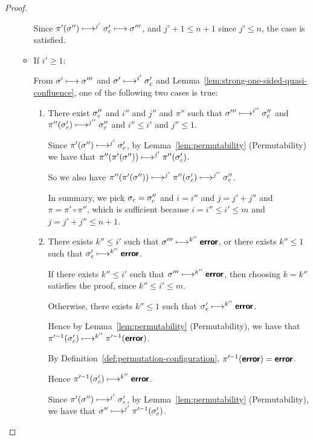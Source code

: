 \begin{proof}
\begin{enumerate}
\begin{itemize}
      Since $\pi'(\sigma'') \longmapsto^{j'} \sigma'_c \longmapsto
      \sigma'''$, and $j' + 1 \leq n + 1$ since $j' \leq n$, the case
      is satisfied.

    \item If $i' \geq 1$:

      From $\sigma' \longmapsto \sigma'''$ and $\sigma' \longmapsto^{i'}
      \sigma_c'$ and Lemma~\ref{lem:strong-one-sided-quasi-confluence},
      one of the following two cases is true:
      \begin{enumerate}
      \item There exist $\sigma_c''$ and $i''$ and $j''$ and $\pi''$
        such that $\sigma''' \longmapsto^{i''} \sigma_c''$ and
        $\pi''(\sigma_c') \longmapsto^{j''} \sigma_c''$ and $i'' \leq
        i'$ and $j'' \leq 1$.

        Since $\pi'(\sigma'') \longmapsto^{j'} \sigma'_c$, by
        Lemma~\ref{lem:permutability} (Permutability) we have that
        $\pi''(\pi'(\sigma'')) \longmapsto^{j'} \pi''(\sigma'_c)$.

        So we also have $\pi''(\pi'(\sigma'')) \longmapsto^{j'}
        \pi''(\sigma'_c) \longmapsto^{j''} \sigma_c''$.

        In summary, we pick $\sigma_c = \sigma_c''$ and $i = i''$ and $j =
        j' + j''$ and $\pi = \pi' \circ \pi''$, which is sufficient
        because $i = i'' \leq i' \leq m$ and $j = j' + j'' \leq n + 1$.

      \item There exists $k'' \leq i'$ such that $\sigma'''
        \longmapsto^{k''} \textbf{\textsf{error}}$, or there exists $k'' \leq 1$ such
        that $\sigma'_c \longmapsto^{k''} \textbf{\textsf{error}}$.

        If there exists $k'' \leq i'$ such that $\sigma'''
        \longmapsto^{k''} \textbf{\textsf{error}}$, then choosing $k = k''$ satisfies
        the proof, since $k'' \leq i' \leq m$.

        Otherwise, there exists $k'' \leq 1$ such
        that $\sigma'_c \longmapsto^{k''} \textbf{\textsf{error}}$.

        Hence by Lemma~\ref{lem:permutability} (Permutability), we
        have that $\pi'^{-1}(\sigma'_c) \longmapsto^{k''}
        \pi'^{-1}(\textbf{\textsf{error}})$.

        By Definition~\ref{def:permutation-configuration},
        $\pi'^{-1}(\textbf{\textsf{error}}) = \textbf{\textsf{error}}$.

        Hence $\pi'^{-1}(\sigma'_c) \longmapsto^{k''} \textbf{\textsf{error}}$.

        Since $\pi'(\sigma'') \longmapsto^{j'} \sigma_c'$, by
        Lemma~\ref{lem:permutability} (Permutability), we have that
        $\sigma'' \longmapsto^{j'} \pi'^{-1}(\sigma_c')$.


\end{enumerate}
\end{itemize}
\end{enumerate}
\end{proof}
